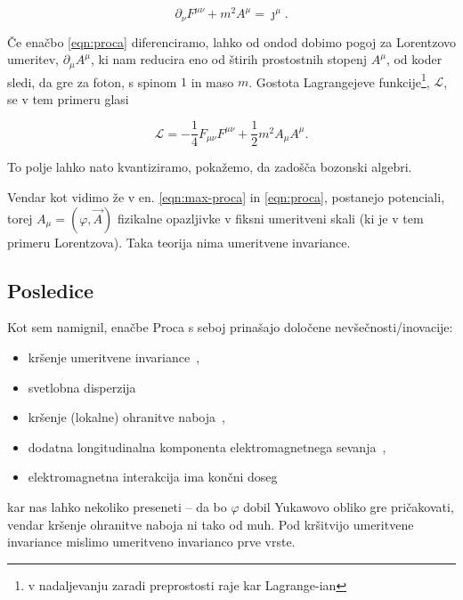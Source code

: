 \documentclass[a4paper, twocolumn, titlepage]{article}
\begin{document}
\begin{equation}
	\partial_\nu F^{\mu\nu} + m^2 A^\mu = \jmath^\mu.
	\label{eqn:proca}
\end{equation}

\v Ce ena\v cbo \eqref{eqn:proca} diferenciramo, lahko od ondod dobimo pogoj za Lorentzovo umeritev, $\partial_\mu
A^\mu$, ki nam reducira eno od \v stirih prostostnih stopenj $A^\mu$, od koder sledi, da gre za foton, s spinom $1$ in
maso $m$. Gostota Lagrangejeve funkcije\footnote{v nadaljevanju zaradi preprostosti raje kar Lagrange-ian}, $\mathcal{L}$,
se v tem primeru glasi

\begin{equation}
	\mathcal{L} = -\frac{1}{4}F_{\mu\nu}F^{\mu\nu} + \frac{1}{2}m^2A_\mu A^\mu.
	\label{eqn:proca-lagrangian}
\end{equation}

To polje lahko nato kvantiziramo, poka\v zemo, da zado\v s\v ca bozonski algebri.

Vendar kot vidimo \v ze v en. \eqref{eqn:max-proca} in \eqref{eqn:proca}, postanejo potenciali, torej $A_\mu =
(\varphi, \vec{A})$ fizikalne opazljivke v fiksni umeritveni skali (ki je v tem primeru Lorentzova). Taka teorija nima
umeritvene invariance.

\subsection{Posledice}

Kot sem namignil, ena\v cbe Proca s seboj prina\v sajo dolo\v cene nev\v se\v cnosti/inovacije:

\begin{itemize}
	\item{kr\v senje umeritvene invariance~\cite{nieto1,nieto2},}
	\item{svetlobna disperzija~\cite{nieto1,nieto2}}
	\item{kr\v senje (lokalne) ohranitve naboja~\cite{nieto2},}
	\item{dodatna longitudinalna komponenta elektromagnetnega sevanja~\cite{nieto1,nieto2},}
	\item{elektromagnetna interakcija ima kon\v cni doseg~\cite{nieto1,nieto2}}
\end{itemize}

kar nas lahko nekoliko preseneti -- da bo $\varphi$ dobil Yukawovo obliko gre pri\v cakovati, vendar kr\v senje ohranitve
naboja ni tako od muh. Pod kr\v sitvijo umeritvene invariance mislimo umeritveno invarianco prve vrste.
\end{document}
